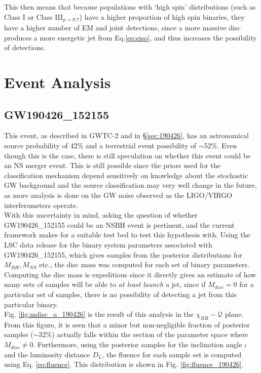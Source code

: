     This then means that because populations with `high spin' distributions (such as
    Class I or Class III$_{\mu = 0.7}$) have a higher proportion of high spin binaries,
    they have a higher number of EM and joint detections, since a more massive disc
    produces a more energetic jet from Eq.\ref{eq:eiso}, and thus increases the
    possibility of detections.

\section{Event Analysis}\label{sec:event_analysis}

    \subsection{GW190426\_152155}\label{ssec:nsbh_190426}

        This event, as described in GWTC-2 and in \S\ref{sec:190426}, has an
        astronomical source probability of 42\% and a terrestrial event possibility of
        $\sim$52\%. Even though this is the case, there is still speculation on whether
        this event could be an NS merger event.  This is still possible since the priors
        used for the classification mechanism depend sensitively on knowledge about the
        stochastic GW background and the source classification may very well change in
        the future, as more analysis is done on the GW noise observed as the LIGO/VIRGO
        interferometers operate.\\
        With this uncertainty in mind, asking the question of whether GW190426\_152155
        could be an NSBH event is pertinent, and the current framework makes for a
        suitable test bed to test this hypothesis with. Using the LSC data release for
        the binary system parameters associated with GW190426\_152155, which gives
        samples from the posterior distributions for $M_{BH}, M_{NS}$ etc., the disc
        mass was computed for each set of binary parameters. Computing the disc mass is
        expeditious since it directly gives an estimate of how many sets of samples will
        be able to \textit{at least launch} a jet, since if $M_{disc} = 0$ for a
        particular set of samples, there is no possibility of detecting a jet from this
        particular binary.\\
        Fig. \ref{fig:mdisc_q_190426} is the result of this analysis in the
        $\chi_{BH}-\mathcal{Q}$ plane. From this figure, it is seen that a minor but
        non-negligible fraction of posterior samples ($\sim$32\%) actually falls within
        the section of the parameter space where $M_{disc} \neq 0$. Furthermore, using
        the posterior samples for the inclination angle $\iota$ and the luminosity
        distance $D_L$, the fluence for each sample set is computed using Eq.
        \ref{eq:fluence}.  This distribution is shown in Fig.
        \ref{fig:fluence_190426}.\\


